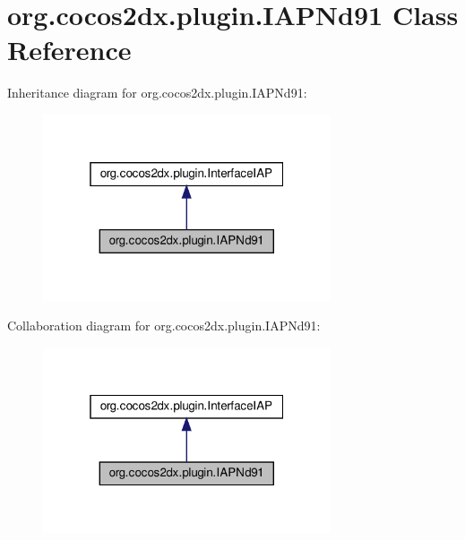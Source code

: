 \hypertarget{classorg_1_1cocos2dx_1_1plugin_1_1IAPNd91}{}\section{org.\+cocos2dx.\+plugin.\+I\+A\+P\+Nd91 Class Reference}
\label{classorg_1_1cocos2dx_1_1plugin_1_1IAPNd91}


Inheritance diagram for org.\+cocos2dx.\+plugin.\+I\+A\+P\+Nd91\+:
\nopagebreak
\begin{figure}[H]
\begin{center}
\leavevmode
\includegraphics[width=241pt]{classorg_1_1cocos2dx_1_1plugin_1_1IAPNd91__inherit__graph}
\end{center}
\end{figure}


Collaboration diagram for org.\+cocos2dx.\+plugin.\+I\+A\+P\+Nd91\+:
\nopagebreak
\begin{figure}[H]
\begin{center}
\leavevmode
\includegraphics[width=241pt]{classorg_1_1cocos2dx_1_1plugin_1_1IAPNd91__coll__graph}
\end{center}
\end{figure}
